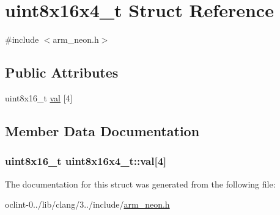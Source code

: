 \hypertarget{structuint8x16x4__t}{\section{uint8x16x4\-\_\-t Struct Reference}
\label{structuint8x16x4__t}
}


{\ttfamily \#include $<$arm\-\_\-neon.\-h$>$}

\subsection*{Public Attributes}
\begin{DoxyCompactItemize}
\item 
uint8x16\-\_\-t \hyperlink{structuint8x16x4__t_a63561bf71d2c03945ee130aa99e4599e}{val} \mbox{[}4\mbox{]}
\end{DoxyCompactItemize}


\subsection{Member Data Documentation}
\hypertarget{structuint8x16x4__t_a63561bf71d2c03945ee130aa99e4599e}{
\subsubsection[{val}]{\setlength{\rightskip}{0pt plus 5cm}uint8x16\-\_\-t uint8x16x4\-\_\-t\-::val\mbox{[}4\mbox{]}}}\label{structuint8x16x4__t_a63561bf71d2c03945ee130aa99e4599e}


The documentation for this struct was generated from the following file\-:\begin{DoxyCompactItemize}
\item 
oclint-\/0../lib/clang/3../include/\hyperlink{arm__neon_8h}{arm\-\_\-neon.\-h}\end{DoxyCompactItemize}
